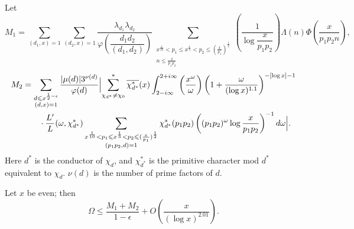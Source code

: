 Let
\[
M_1=\sum_{(d_1,x)=1}\sum_{(d_2,x)=1}\frac{\lambda_{d_1}\lambda_{d_2}}{\varphi\left(\dfrac{d_1d_2}{(d_1,d_2)}\right)}
\sum_{\substack{x^{\frac1{10}}<p_1\leqslant x^{\frac13}<p_2\leqslant(\frac{x}{p_1})^{\frac12}\\n\leqslant\frac{x}{p_1p_2}}}
\left(\frac{1}{\log\dfrac{x}{p_1p_2}}\right)\Lambda(n)\Phi\left(\frac{x}{p_1p_2n}\right),
\]
\begin{align*}
M_2&=\sum_{\substack{d\leqslant x^{\frac12-\epsilon}\\(d,x)=1}}\frac{|\mu(d)|3^{\nu(d)}}{\varphi(d)}
\Bigl|\sum_{\chi_{d^*}\neq\chi_0}^{*}\overline{\chi_{d^*}^*}(x)
\int_{2-i\infty}^{2+i\infty}\left(\frac{x^\omega}{\omega}\right)\left(1+\frac{\omega}{(\log x)^{1.1}}\right)^{-[\log x]-1}\\
&\qquad\cdot\frac{L'}{L}(\omega,\chi_{d^*}^*)
\sum_{\substack{x^{\frac1{10}}<p_1\leqslant x^{\frac13}<p_2\leqslant(\frac{x}{p_1})^{\frac12}\\(p_1p_2,d)=1}}
\chi_{d^*}^*(p_1p_2)\left((p_1p_2)^\omega\log\frac{x}{p_1p_2}\right)^{-1}d\omega\Bigr|.
\end{align*}
Here $d^*$ is the conductor of $\chi_d$, and $\chi_{d^*}^*$ is the primitive character mod $d^*$ equivalent to $\chi_d$. $\nu(d)$ is the number of prime factors of $d$.

\begin{lemma}
Let $x$ be even; then
\[
\Omega\leqslant\frac{M_1+M_2}{1-\epsilon}+O\left(\frac{x}{(\log x)^{2.01}}\right).
\]
\end{lemma}

